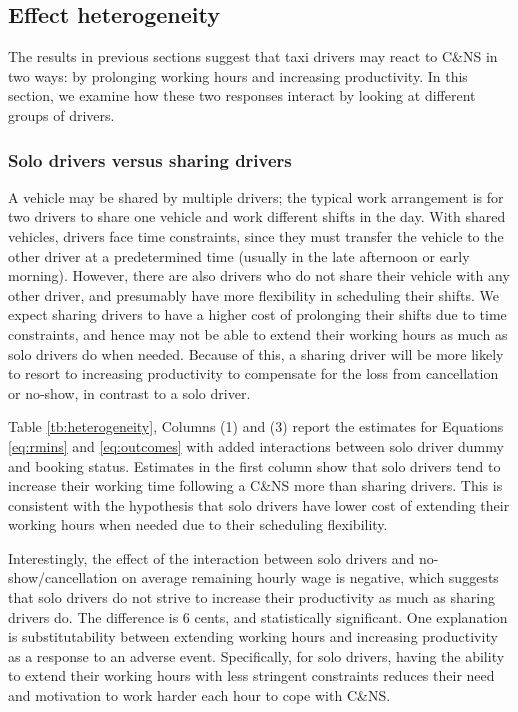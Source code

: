 \documentclass[reviewmode,AEJ]{AEA}
\begin{document}
\subsection{Effect heterogeneity}

The results in previous sections suggest that taxi drivers may react to C\&NS in two ways: by prolonging 
working hours and increasing productivity. In this section, we examine how these two responses interact 
by looking at different groups of drivers.

\subsubsection{Solo drivers versus sharing drivers}

A vehicle may be shared by multiple drivers; the typical work arrangement is for two drivers to share one 
vehicle and work different shifts in the day. With shared vehicles, drivers face time constraints, 
since they must transfer the vehicle to the other driver at a predetermined time (usually in the late 
afternoon or early morning). However, there are also drivers who do not share their vehicle with any 
other driver, and presumably have more flexibility in scheduling their shifts.
We expect sharing drivers to have a higher cost of prolonging their shifts due to time constraints, 
and hence may not be able to extend their working hours as much as solo drivers do when needed. 
Because of this, a sharing driver will be more likely to resort to increasing productivity to compensate 
for the loss from cancellation or no-show, in contrast to a solo driver.

Table \ref{tb:heterogeneity}, Columns (1) and (3) report the estimates for Equations \eqref{eq:rmins} 
and \eqref{eq:outcomes} with added interactions between solo driver dummy and booking status. Estimates
in the first column show that solo drivers tend to increase their working time following a C\&NS more
than sharing drivers. This is consistent with the hypothesis that solo drivers have lower cost of extending
their working hours when needed due to their scheduling flexibility.

Interestingly, the effect of the interaction between solo drivers and no-show/cancellation on average
remaining hourly wage is negative, which suggests that solo drivers do not strive to increase their 
productivity as much as sharing drivers do. The difference is 6 cents, and statistically significant.
One explanation is substitutability between extending working hours and increasing productivity as a 
response to an adverse event. Specifically, for solo drivers, having the ability to extend their working
hours with less stringent constraints reduces their need and motivation to work harder each hour to cope
with C\&NS.
\end{document}
